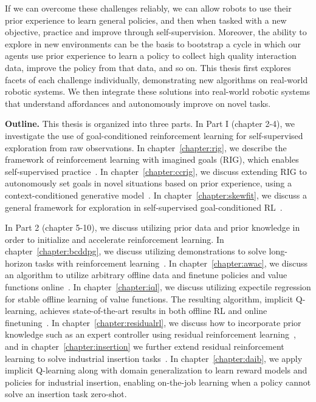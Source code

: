 If we can overcome these challenges reliably, we can allow robots to use their prior experience to learn general policies, and then when tasked with a new objective, practice and improve through self-supervision.
Moreover, the ability to explore in new environments can be the basis to bootstrap a cycle in which our agents use prior experience to learn a policy to collect high quality interaction data, improve the policy from that data, and so on.
This thesis first explores facets of each challenge individually, demonstrating new algorithms on real-world robotic systems.
We then integrate these solutions into real-world robotic systems that understand affordances and autonomously improve on novel tasks.

\vspace{5mm}

\textbf{Outline.} This thesis is organized into three parts. In Part I (chapter 2-4), we investigate the use of goal-conditioned reinforcement learning for self-supervised exploration from raw observations. In chapter~\ref{chapter:rig}, we describe the framework of reinforcement learning with imagined goals (RIG), which enables self-supervised practice~\citep{nair2018rig}. In chapter~\ref{chapter:ccrig}, we discuss extending RIG to autonomously set goals in novel situations based on prior experience, using a context-conditioned generative model~\citep{nair2019ccrig}. In chapter~\ref{chapter:skewfit}, we discuss a general framework for exploration in self-supervised goal-conditioned RL~\citep{pong2019skewfit}.

In Part 2 (chapter 5-10), we discuss utilizing prior data and prior knowledge in order to initialize and accelerate reinforcement learning. In chapter~\ref{chapter:bcddpg}, we discuss utilizing demonstrations to solve long-horizon tasks with reinforcement learning~\citep{nair2018demonstrations}. In chapter~\ref{chapter:awac}, we discuss an algorithm to utilize arbitrary offline data and finetune policies and value functions online~\citep{nair2020awac}. In chapter~\ref{chapter:iql}, we discuss utilizing expectile regression for stable offline learning of value functions. The resulting algorithm, implicit Q-learning, achieves state-of-the-art results in both offline RL and online finetuning~\citep{kostrikov2021iql}. In chapter~\ref{chapter:residualrl}, we discuss how to incorporate prior knowledge such as an expert controller using residual reinforcement learning~\citep{johannink18residualrl}, and in chapter~\ref{chapter:insertion} we further extend residual reinforcement learning to solve industrial insertion tasks~\citep{schoettler2019insertion}. In chapter~\ref{chapter:daib}, we apply implicit Q-learning along with domain generalization to learn reward models and policies for industrial insertion, enabling on-the-job learning when a policy cannot solve an insertion task zero-shot. 

